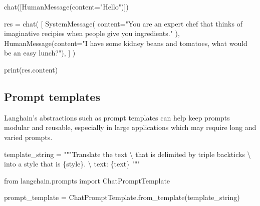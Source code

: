 \documentclass[
  letterpaper,
  DIV=11,
  numbers=noendperiod]{scrreprt}
\newenvironment{Shaded}{\begin{snugshade}}{\end{snugshade}}
\newcommand{\BuiltInTok}[1]{\textcolor[rgb]{0.00,0.23,0.31}{#1}}
\newcommand{\CharTok}[1]{\textcolor[rgb]{0.13,0.47,0.30}{#1}}
\newcommand{\ImportTok}[1]{\textcolor[rgb]{0.00,0.46,0.62}{#1}}
\newcommand{\NormalTok}[1]{\textcolor[rgb]{0.00,0.23,0.31}{#1}}
\newcommand{\OperatorTok}[1]{\textcolor[rgb]{0.37,0.37,0.37}{#1}}
\newcommand{\SpecialCharTok}[1]{\textcolor[rgb]{0.37,0.37,0.37}{#1}}
\newcommand{\StringTok}[1]{\textcolor[rgb]{0.13,0.47,0.30}{#1}}
\begin{document}
\begin{Shaded}
\begin{Highlighting}[]
\NormalTok{chat([HumanMessage(content}\OperatorTok{=}\StringTok{"Hello"}\NormalTok{)])}
\end{Highlighting}
\end{Shaded}

\begin{Shaded}
\begin{Highlighting}[]
\NormalTok{res }\OperatorTok{=}\NormalTok{ chat(}
\NormalTok{    [}
\NormalTok{        SystemMessage(}
\NormalTok{            content}\OperatorTok{=}\StringTok{"You are an expert chef that thinks of imaginative recipies when people give you ingredients."}
\NormalTok{        ),}
\NormalTok{        HumanMessage(content}\OperatorTok{=}\StringTok{"I have some kidney beans and tomatoes, what would be an easy lunch?"}\NormalTok{),}
\NormalTok{    ]}
\NormalTok{)}

\BuiltInTok{print}\NormalTok{(res.content)}
\end{Highlighting}
\end{Shaded}

\hypertarget{prompt-templates}{%
\subsection{Prompt templates}\label{prompt-templates}}

Langhain's abstractions such as prompt templates can help keep prompts
modular and reusable, especially in large applications which may require
long and varied prompts.

\begin{Shaded}
\begin{Highlighting}[]
\NormalTok{template\_string }\OperatorTok{=} \StringTok{"""Translate the text }\CharTok{\textbackslash{}}
\StringTok{that is delimited by triple backticks }\CharTok{\textbackslash{}}
\StringTok{into a style that is }\SpecialCharTok{\{style\}}\StringTok{. }\CharTok{\textbackslash{}}
\StringTok{text: \textasciigrave{}\textasciigrave{}\textasciigrave{}}\SpecialCharTok{\{text\}}\StringTok{\textasciigrave{}\textasciigrave{}\textasciigrave{}}
\StringTok{"""}
\end{Highlighting}
\end{Shaded}

\begin{Shaded}
\begin{Highlighting}[]
\ImportTok{from}\NormalTok{ langchain.prompts }\ImportTok{import}\NormalTok{ ChatPromptTemplate}

\NormalTok{prompt\_template }\OperatorTok{=}\NormalTok{ ChatPromptTemplate.from\_template(template\_string)}
\end{Highlighting}
\end{Shaded}
\end{document}
